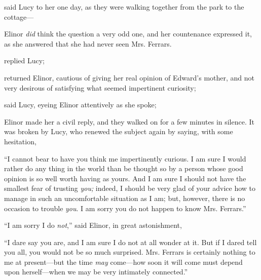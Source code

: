  said Lucy to her one day, as they were walking together from the park to the cottage---

Elinor {\em did} think the question a very odd one, and her countenance expressed it, as she answered that she had never seen Mrs. Ferrars.

 replied Lucy; 

 returned Elinor, cautious of giving her real opinion of Edward's mother, and not very desirous of satisfying what seemed impertinent curiosity; 

 said Lucy, eyeing Elinor attentively as she spoke; 

Elinor made her a civil reply, and they walked on for a few minutes in silence. It was broken by Lucy, who renewed the subject again by saying, with some hesitation,

“I cannot bear to have you think me impertinently curious. I am sure I would rather do any thing in the world than be thought so by a person whose good opinion is so well worth having as yours. And I am sure I should not have the smallest fear of trusting {\em you;} indeed, I should be very glad of your advice how to manage in such an uncomfortable situation as I am; but, however, there is no occasion to trouble {\em you}. I am sorry you do not happen to know Mrs. Ferrars.”

“I am sorry I do {\em not},” said Elinor, in great astonishment, 

“I dare say you are, and I am sure I do not at all wonder at it. But if I dared tell you all, you would not be so much surprised. Mrs. Ferrars is certainly nothing to me at present---but the time {\em may} come---how soon it will come must depend upon herself---when we may be very intimately connected.”

